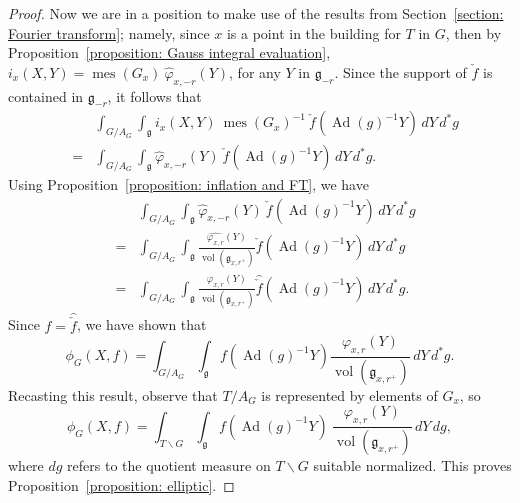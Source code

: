 \documentclass[11pt]{amsart}
\theoremstyle{definition}
\theoremstyle{remark}
\numberwithin{equation}{theorem}
\def\GF{{G}}
\def\AG{{A_G}}
\def\TF{{T}}
\def\gF{{\mathfrak{g}}}
\def\orbint{{\phi}}
\def\vphi{{\varphi}}
\def\hphi{{\hat{\varphi}}}
\def\i{{i}}
\def\Ad{{\rm Ad}}
\def\rightcoset{{ / }}
\def\leftcoset{{\backslash}}
\def\vol{{\operatorname{vol}}}
\def\meas{{\operatorname{mes}}}
\def\vol{\operatorname{vol}}
\def\Ad{\operatorname{Ad}}
\begin{document}
\begin{proof}
Now we are in a position to make use of the results from
Section~\ref{section: Fourier transform}; namely, since $x$ is a
point in the building for $\TF$ in $\GF$, then by
Proposition~\ref{proposition: Gauss integral evaluation},
$\i_x(X,Y) = \meas(\GF_x)\ \hphi_{x,-r}(Y)$, for any $Y$ in
$\gF_{-r}$. Since the support of $\check{f}$ is contained in
$\gF_{-r}$, it follows that
\begin{eqnarray*}
&&\int_{\GF\rightcoset\AG}\int_{\gF}
         \i_x(X,Y)\ \meas(\GF_x)^{-1}\ \check{f}(\Ad(g)^{-1}Y)
                \, dY\, d^*g\\
    &=& \int_{\GF\rightcoset\AG} \int_{\gF}
        \hphi_{x,-r}(Y)\ \check{f}(\Ad(g)^{-1}Y)\, dY\, d^*g.
\end{eqnarray*}
Using Proposition~\ref{proposition: inflation and FT}, we have
\begin{eqnarray*}
&& \int_{\GF\rightcoset\AG} \int_{\gF}
        \hphi_{x,-r}(Y)\ \check{f}(\Ad(g)^{-1}Y)\, dY\, d^*g\\
    &=&
        \int_{\GF\rightcoset\AG} \int_{\gF}
\frac{\widehat{\vphi_{x,r}}(Y)}{\vol(\gF_{x,r^+})}\check{f}(\Ad(g)^{-1}Y)\,
dY\, d^*g\\
    &=&    \int_{\GF\rightcoset\AG} \int_{\gF}
\frac{\vphi_{x,r}(Y)}{\vol(\gF_{x,r^+})}\widehat{\check{f}}(\Ad(g)^{-1}Y)\,
dY\, d^*g.
\end{eqnarray*}
Since $f = \widehat{\check{f}}$, we have shown that
\begin{equation}
\orbint_\GF(X,f) =
        \int_{\GF\rightcoset\AG} \int_{\gF}
        f(\Ad(g)^{-1}Y) \frac{\vphi_{x,r}(Y)}{\vol(\gF_{x,r^+})}\, dY\,
d^*g.
\end{equation}
Recasting this result, observe that $\TF\rightcoset\AG$ is
represented by elements of $\GF_x$, so
\begin{equation}
\orbint_\GF(X,f) =
        \int_{\TF\leftcoset\GF} \int_{\gF}
        f(\Ad(g)^{-1}Y)\ \frac{\vphi_{x,r}(Y)}{\vol(\gF_{x,r^+})}\, dY\, dg,
\end{equation}
where $dg$ refers to the quotient measure on $\TF\leftcoset\GF$ suitable normalized.
This proves Proposition~\ref{proposition: elliptic}.
\end{proof}
\end{document}
